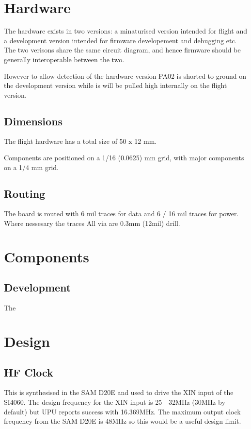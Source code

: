 \documentclass[12pt]{article}
\begin{document}
\section{Hardware}

The hardware exists in two versions: a minaturised version intended
for flight and a development version intended for firmware
developement and debugging etc. The two verisons share the same
circuit diagram, and hence firmware should be generally interoperable
between the two.

However to allow detection of the hardware version PA02 is shorted to
ground on the development version while is will be pulled high
internally on the flight version.

\subsection{Dimensions}

The flight hardware has a total size of 50 x 12 mm.

Components are positioned on a 1/16 (0.0625) mm grid, with major
components on a 1/4 mm grid.

\subsection{Routing}

The board is routed with 6 mil traces for data and 6 / 16 mil traces
for power. Where nessesary the traces  All via are 0.3mm (12mil) drill.

\section{Components}

\subsection{Development}

The

\section{Design}

\subsection{HF Clock}

This is synthesised in the SAM D20E and used to drive the XIN input of
the SI4060. The design frequency for the XIN input is 25 - 32MHz
(30MHz by default) but UPU reports success with 16.369MHz. The maximum
output clock frequency from the SAM D20E is 48MHz so this would be a
useful design limit.
\end{document}
